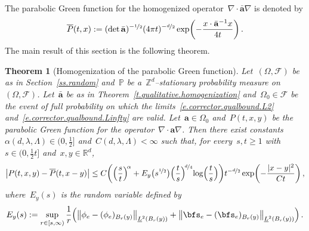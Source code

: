 \documentclass[11pt,twoside]{article} %
\numberwithin{equation}{section}
\newtheorem{theorem}{Theorem}[section]
\theoremstyle{definition}
\let\originalleft\left
\let\originalright\right
\renewcommand{\left}{\mathopen{}\mathclose\bgroup\originalleft}
\renewcommand{\right}{\aftergroup\egroup\originalright}
\newcommand*{\Zd}{\ensuremath{\mathbb{Z}^d}}
\newcommand*{\Rd}{\ensuremath{\mathbb{R}^d}}
\renewcommand{\a}{\mathbf{a}}
\newcommand{\ahom}{\bar{\a}}
\newcommand{\F}{\mathcal{F}}
\renewcommand{\P}{\mathbb{P}}
\begin{document}
\smallskip

The parabolic Green function for the homogenized operator~$\nabla \cdot\ahom \nabla$ is denoted by 
\begin{equation*}
\overline{P} (t,x) 
:= 
( \det \ahom )^{-\nicefrac12} 
(4\pi t)^{-\nicefrac d2} 
\exp \biggl( 
-\frac{x\cdot \ahom^{-1} x }{4t} 
\biggr)
\,.
\end{equation*}
The main result of this section is the following theorem. 

\begin{theorem}[Homogenization of the parabolic Green function] \hspace{-2pt} 
\label{t.parabolic.GF}
Let~$(\Omega,\F)$ be as in Section~\ref{ss.random} and~$\P$ be a~$\Zd$--stationary probability measure on~$(\Omega,\F)$. Let~$\ahom$ be as in Theorem~\ref{t.qualitative.homogenization} and~$\Omega_0 \in \F$ be the event of full probability on which the limits~\eqref{e.corrector.qualbound.L2} and~\eqref{e.corrector.qualbound.Linfty} are valid. 
Let~$\a\in \Omega_0$ and~$P(t,x,y)$ be the parabolic Green function for the operator~$\nabla \cdot \a\nabla$.
Then there exist constants~$\alpha(d,\lambda,\Lambda) \in (0,\frac12]$ and~$C(d,\lambda,\Lambda) <\infty$ such that, for every~$s,t\geq 1$ with~$s \in (0,\tfrac12t]$ and~$x,y\in\Rd$, 
\begin{equation}
\label{e.P.to.Pbar}
\bigl| P(t,x,y) - \overline{P}(t,x-y) \bigr| 
\leq
C\biggl( 
\Bigl( \frac{s}{t} \Bigr)^{\! \alpha}
+
E_y\bigl(s^{\nicefrac12}\bigr)  \Bigl( \frac{t}{s} \Bigr)^{\!\nicefrac d4} \!\log\Bigl( \frac{t}{s} \Bigr) 
\biggr)
t^{-\nicefrac d2} \exp \biggl( -\frac{|x-y|^2}{Ct} \biggr)
\,,
\end{equation}
where~$E_y(s)$ is the random variable defined by
\begin{equation} \label{e.Es.def}
E_y(s): =
\sup_{ r \in [s,\infty)} 
\frac1r
\Bigl( 
\left\| \phi_e - (\phi_e)_{B_r(y)} \right\|_{\underline{L}^2(B_{r}(y))}
+
\left\| \bfs_e - (\bfs_e)_{B_r(y)} \right\|_{\underline{L}^2(B_{r}(y))}
\Bigr) 
\,.
\end{equation}
\end{theorem}
\end{document}
